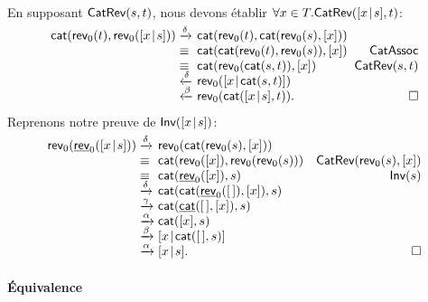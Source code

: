 \noindent En supposant
\(\textsf{CatRev}({s,t})\), nous devons
établir \(\forall x \in T.\textsf{CatRev}({[{x}\!\mid\!{s}],t})\):
 
\begin{equation*}
\begin{array}{@{}r@{\;}l@{\;}l@{\;\;}r@{}}
  \fun{cat}(\fun{rev}_0(t),\fun{rev}_0(\cons{x}{s}))
& \xrightarrow{\smash{\delta}}
& \fun{cat}(\fun{rev}_0(t),\fun{cat}(\fun{rev}_0(s),[x]))\\
& \equiv
& \fun{cat}(\fun{cat}(\fun{rev}_0(t),\fun{rev}_0(s)),[x])
& \IH{\predName{CatAssoc}}\\
& \equiv
& \fun{cat}(\fun{rev}_0(\fun{cat}(s,t)),[x])
& \IH{\pred{CatRev}{s,t}}\\
& \xleftarrow{\smash{\delta}}
& \fun{rev}_0(\cons{x}{\fun{cat}(s,t)})\\
& \xleftarrow{\smash{\beta}}
& \fun{rev}_0(\fun{cat}(\cons{x}{s},t)).
& \multicolumn{1}{r@{}}{\Box}
\end{array}
\end{equation*}
Reprenons notre preuve de
\(\textsf{Inv}({[{x}\!\mid\!{s}]})\):
\begin{equation*}
\begin{array}{@{}r@{\;}l@{\;}l@{\quad}r@{}}
  \fun{rev}_0(\ufun{rev}_0(\cons{x}{s}))
& \xrightarrow{\smash{\delta}}
& \fun{rev}_0(\fun{cat}(\fun{rev}_0(s),[x]))\\
& \equiv
& \fun{cat}(\fun{rev}_0([x]),\fun{rev}_0(\fun{rev}_0(s)))
& \IH{\pred{CatRev}{\fun{rev}_0(s),[x]}}\\
& \equiv
& \fun{cat}(\ufun{rev}_0([x]),s)
& \IH{\pred{Inv}{s}}\\
& \xrightarrow{\smash{\delta}}
& \fun{cat}(\fun{cat}(\ufun{rev}_0(\el),[x]),s)\\
& \xrightarrow{\smash{\gamma}}
& \fun{cat}(\ufun{cat}(\el,[x]),s)\\
& \xrightarrow{\smash{\alpha}}
& \fun{cat}([x],s)\\
& \xrightarrow{\smash{\beta}}
& \cons{x}{\fun{cat}(\el,s)}\\
& \xrightarrow{\smash{\alpha}}
& \cons{x}{s}.
& \hfill \Box
\end{array}
\end{equation*}

\paragraph{Équivalence}

